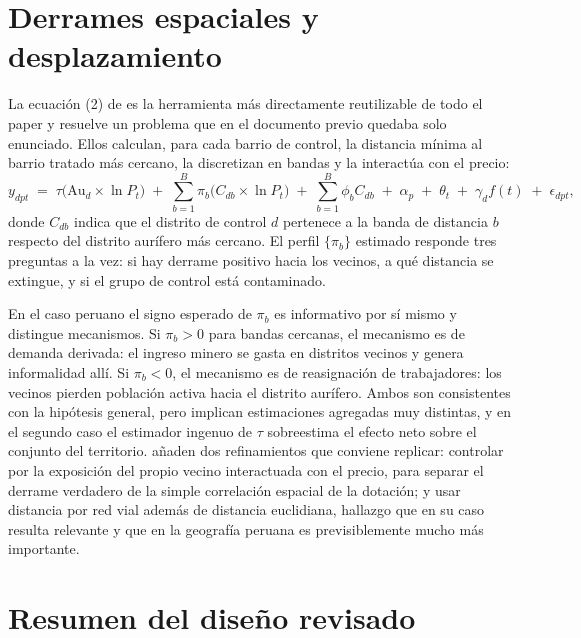 \documentclass[11pt,a4paper]{article}
\newcommand{\Au}{\mathrm{Au}}
\begin{document}
\section{Derrames espaciales y desplazamiento}

La ecuación (2) de \citet{braakmann2024} es la herramienta más directamente reutilizable de todo el paper y resuelve un problema que en el documento previo quedaba solo enunciado. Ellos calculan, para cada barrio de control, la distancia mínima al barrio tratado más cercano, la discretizan en bandas y la interactúa con el precio:
\begin{equation}
y_{dpt} \;=\; \tau\bigl(\Au_d \times \ln P_t\bigr) \;+\; \sum_{b=1}^{B}\pi_b \bigl(C_{db} \times \ln P_t\bigr) \;+\; \sum_{b=1}^{B}\phi_b C_{db} \;+\; \alpha_p \;+\; \theta_t \;+\; \gamma_d f(t) \;+\; \epsilon_{dpt},
\label{eq:spillover}
\end{equation}
donde $C_{db}$ indica que el distrito de control $d$ pertenece a la banda de distancia $b$ respecto del distrito aurífero más cercano. El perfil $\{\pi_b\}$ estimado responde tres preguntas a la vez: si hay derrame positivo hacia los vecinos, a qué distancia se extingue, y si el grupo de control está contaminado.

En el caso peruano el signo esperado de $\pi_b$ es informativo por sí mismo y distingue mecanismos. Si $\pi_b > 0$ para bandas cercanas, el mecanismo es de demanda derivada: el ingreso minero se gasta en distritos vecinos y genera informalidad allí. Si $\pi_b < 0$, el mecanismo es de reasignación de trabajadores: los vecinos pierden población activa hacia el distrito aurífero. Ambos son consistentes con la hipótesis general, pero implican estimaciones agregadas muy distintas, y en el segundo caso el estimador ingenuo de $\tau$ sobreestima el efecto neto sobre el conjunto del territorio. \citet{braakmann2024} añaden dos refinamientos que conviene replicar: controlar por la exposición del propio vecino interactuada con el precio, para separar el derrame verdadero de la simple correlación espacial de la dotación; y usar distancia por red vial además de distancia euclidiana, hallazgo que en su caso resulta relevante y que en la geografía peruana es previsiblemente mucho más importante.

\section{Resumen del diseño revisado}
\end{document}
